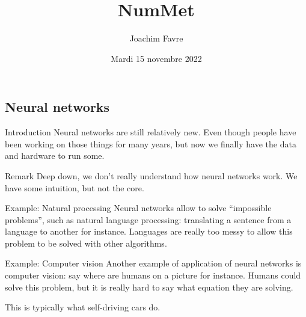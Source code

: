 \documentclass[a4paper]{article}
\title{NumMet}
\author{Joachim Favre}
\date{Mardi 15 novembre 2022}
\begin{document}
\maketitle


\subsection{Neural networks}
\begin{parag}{Introduction}
    Neural networks are still relatively new. Even though people have been working on those things for many years, but now we finally have the data and hardware to run some.

    \begin{subparag}{Remark}
        Deep down, we don't really understand how neural networks work. We have some intuition, but not the core.
    \end{subparag}
\end{parag}

\begin{parag}{Example: Natural processing}
    Neural networks allow to solve ``impossible problems'', such as natural language processing: translating a sentence from a language to another for instance. Languages are really too messy to allow this problem to be solved with other algorithms.
\end{parag}


\begin{parag}{Example: Computer vision}
    Another example of application of neural networks is computer vision: say where are humans on a picture for instance. Humans could solve this problem, but it is really hard to say what equation they are solving.

    This is typically what self-driving cars do.
\end{parag}
\end{document}
